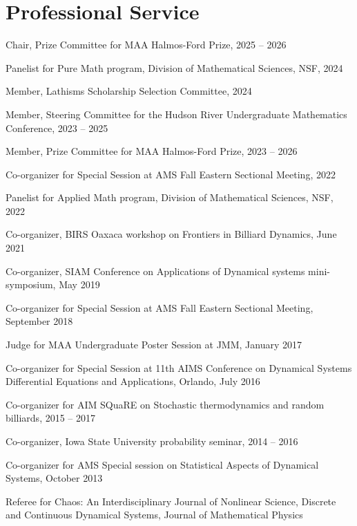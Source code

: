 \documentclass[10pt,letterpaper]{article}
\renewenvironment{itemize}{
  \begin{list}{}{
    \setlength{\leftmargin}{1.5em}
    \setlength{\itemsep}{0.25em}
    \setlength{\parskip}{0pt}
    \setlength{\parsep}{0.25em}
  }
}{
  \end{list}
}
\providecommand{\tightlist}{%
  \setlength{\itemsep}{0pt}\setlength{\parskip}{0pt}}
\let\tightlist\relax
\begin{document}
\hypertarget{professional-service}{%
\section*{Professional Service}\label{professional-service}}

\begin{itemize}
\tightlist
\item
  Chair, Prize Committee for MAA Halmos-Ford Prize, 2025 -- 2026
\item
  Panelist for Pure Math program, Division of Mathematical Sciences,
  NSF, 2024
\item
  Member, Lathisms Scholarship Selection Committee, 2024
\item
  Member, Steering Committee for the Hudson River Undergraduate
  Mathematics Conference, 2023 -- 2025
\item
  Member, Prize Committee for MAA Halmos-Ford Prize, 2023 -- 2026
\item
  Co-organizer for Special Session at AMS Fall Eastern Sectional
  Meeting, 2022
\item
  Panelist for Applied Math program, Division of Mathematical Sciences,
  NSF, 2022
\item
  Co-organizer, BIRS Oaxaca workshop on Frontiers in Billiard Dynamics,
  June 2021
\item
  Co-organizer, SIAM Conference on Applications of Dynamical systems
  mini-symposium, May 2019
\item
  Co-organizer for Special Session at AMS Fall Eastern Sectional
  Meeting, September 2018
\item
  Judge for MAA Undergraduate Poster Session at JMM, January 2017
\item
  Co-organizer for Special Session at 11th AIMS Conference on Dynamical
  Systems Differential Equations and Applications, Orlando, July 2016
\item
  Co-organizer for AIM SQuaRE on Stochastic thermodynamics and random
  billiards, 2015 -- 2017
\item
  Co-organizer, Iowa State University probability seminar, 2014 -- 2016
\item
  Co-organizer for AMS Special session on Statistical Aspects of
  Dynamical Systems, October 2013
\item
  Referee for Chaos: An Interdisciplinary Journal of Nonlinear Science,
  Discrete and Continuous Dynamical Systems, Journal of Mathematical
  Physics
\end{itemize}
\end{document}
